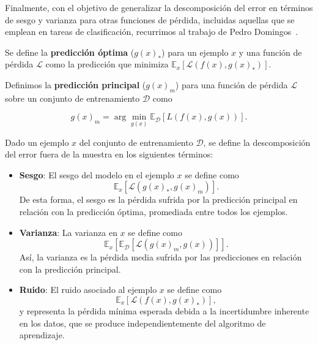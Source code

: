 Finalmente, con el objetivo de generalizar la descomposición del error en términos de sesgo y varianza para otras funciones de pérdida, incluidas aquellas que se emplean en tareas de clasificación, recurrimos al trabajo de Pedro Domingos~\cite{Domingos2000}.

\begin{definicion}
    Se define la \textbf{predicción óptima} ($g(x)_{*}$) para un ejemplo $x$ y una función de pérdida $\mathcal{L}$ como la predicción que minimiza $\mathbb{E}_{x}[\mathcal{L}(f(x), g(x)_{*})]$.
\end{definicion}

\begin{definicion}
    Definimos la \textbf{predicción principal} ($g(x)_{m}$) para una función de pérdida $\mathcal{L}$ sobre un conjunto de entrenamiento $\mathcal{D}$ como

    \[
        g(x)_{m} = \arg\min_{g(x)} \mathbb{E}_{\mathcal{D}}[L(f(x), g(x))].
    \]
\end{definicion}

\begin{definicion}
    Dado un ejemplo $x$ del conjunto de entrenamiento $\mathcal{D}$, se define la descomposición del error fuera de la muestra en los siguientes términos:
    
    \begin{itemize}
        \item \textbf{Sesgo}: El sesgo del modelo en el ejemplo $x$ se define como
        \[
            \mathbb{E}_{x}[\mathcal{L}(g(x)_{*}, g(x)_{m})].
        \]
        De esta forma, el sesgo es la pérdida sufrida por la predicción principal en relación con la predicción óptima, promediada entre todos los ejemplos.
    
        \item \textbf{Varianza}: La varianza en $x$ se define como
        \[
            \mathbb{E}_{x}[\mathbb{E}_{\mathcal{D}}[\mathcal{L}(g(x)_{m}, g(x))]].
        \]
        Así, la varianza es la pérdida media sufrida por las predicciones en relación con la predicción principal.
    
        \item \textbf{Ruido}: El ruido asociado al ejemplo $x$ se define como
        \[
            \mathbb{E}_{x}[\mathcal{L}(f(x), g(x)_{*})],
        \]
        y representa la pérdida mínima esperada debida a la incertidumbre inherente en los datos, que se produce independientemente del algoritmo de aprendizaje.
    \end{itemize}
\end{definicion}

